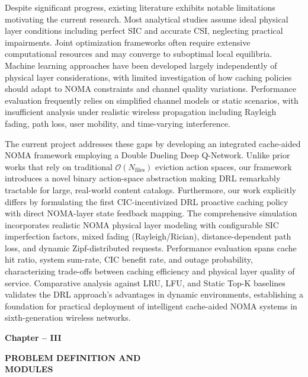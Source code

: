 \documentclass[12pt,a4paper]{article}
\begin{document}
Despite significant progress, existing literature exhibits notable limitations motivating the current research. Most analytical studies assume ideal physical layer conditions including perfect SIC and accurate CSI, neglecting practical impairments. Joint optimization frameworks often require extensive computational resources and may converge to suboptimal local equilibria. Machine learning approaches have been developed largely independently of physical layer considerations, with limited investigation of how caching policies should adapt to NOMA constraints and channel quality variations. Performance evaluation frequently relies on simplified channel models or static scenarios, with insufficient analysis under realistic wireless propagation including Rayleigh fading, path loss, user mobility, and time-varying interference.

The current project addresses these gaps by developing an integrated cache-aided NOMA framework employing a Double Dueling Deep Q-Network. Unlike prior works that rely on traditional $\mathcal{O}(N_{\text{files}})$ eviction action spaces, our framework introduces a novel binary action-space abstraction making DRL remarkably tractable for large, real-world content catalogs. Furthermore, our work explicitly differs by formulating the first CIC-incentivized DRL proactive caching policy with direct NOMA-layer state feedback mapping. The comprehensive simulation incorporates realistic NOMA physical layer modeling with configurable SIC imperfection factors, mixed fading (Rayleigh/Rician), distance-dependent path loss, and dynamic Zipf-distributed requests. Performance evaluation spans cache hit ratio, system sum-rate, CIC benefit rate, and outage probability, characterizing trade-offs between caching efficiency and physical layer quality of service. Comparative analysis against LRU, LFU, and Static Top-K baselines validates the DRL approach's advantages in dynamic environments, establishing a foundation for practical deployment of intelligent cache-aided NOMA systems in sixth-generation wireless networks.

\thispagestyle{plain}


\clearpage

\begin{center}
    \vspace*{10cm}
    
    {\fontsize{16}{19.2}\selectfont\bfseries
    Chapter -- III}
    
    \vspace{1cm}
    
    {\fontsize{16}{19.2}\selectfont\bfseries
    PROBLEM DEFINITION AND\\
    MODULES}
    
    \vspace*{\fill}
\end{center}
\end{document}

